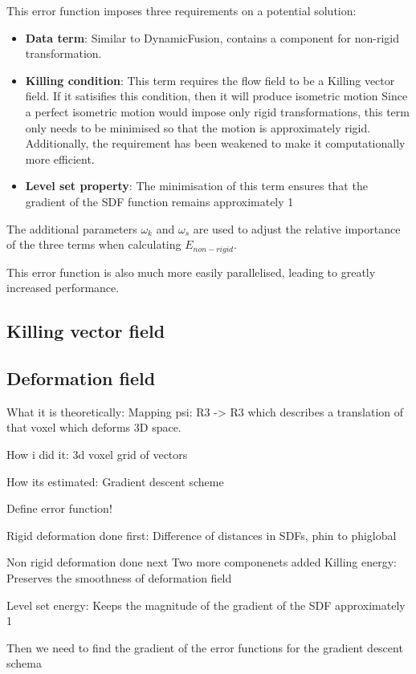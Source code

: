 \documentclass[12pt,twoside]{report}
\begin{document}
This error function imposes three requirements on a potential solution:
\begin{itemize}
\item \textbf{Data term}: Similar to DynamicFusion, contains a component for non-rigid transformation.
\item \textbf{Killing condition}: This term requires the flow field to be a Killing vector field. If it satisifies this condition, then it will produce isometric motion Since a perfect isometric motion would impose only rigid transformations, this term only needs to be minimised so that the motion is approximately rigid. Additionally, the requirement has been weakened to make it computationally more efficient.
\item \textbf{Level set property}: The minimisation of this term ensures that the gradient of the SDF function remains approximately 1
\end{itemize}

The additional parameters $\omega_k$ and $\omega_s$ are used to adjust the relative importance of the three terms when calculating $E_{non-rigid}$.

This error function is also much more easily parallelised, leading to greatly increased performance.\\


\subsection{Killing vector field}

\subsection{Deformation field}
What it is theoretically:
Mapping psi: R3 -> R3 which describes a translation of that voxel which deforms 3D space.

How i did it:
3d voxel grid of vectors

How its estimated:
Gradient descent scheme

Define error function!

Rigid deformation done first:
Difference of distances in SDFs, phin to phiglobal

Non rigid deformation done next
Two more componenets added
Killing energy:
Preserves the smoothness of deformation field

Level set energy:
Keeps the magnitude of the gradient of the SDF approximately 1

Then we need to find the gradient of the error functions for the gradient descent schema
\end{document}
